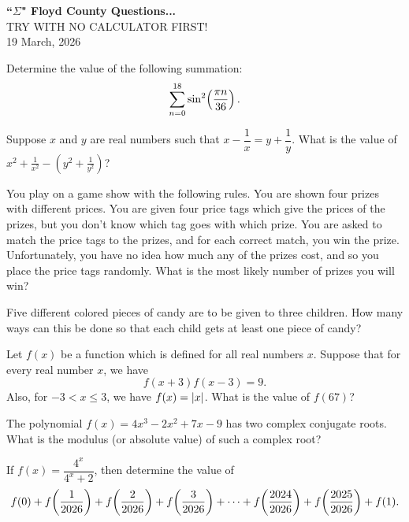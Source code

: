 \documentclass[11pt]{article}
\begin{document}
\begin{center}
{\Large\bfseries ``$\Sigma$" Floyd County Questions...}\\[0.25cm]
{\small TRY WITH NO CALCULATOR FIRST!}\\[0.25cm]
{\large 19 March, 2026}\\[1cm]
\end{center}



\problem Determine the value of the following summation:
\[
\sum_{n=0}^{18}\sin^2\!\left(\frac{\pi n}{36}\right).
\]

\problem Suppose $x$ and $y$ are real numbers such that $x-\dfrac{1}{x}=y+\dfrac{1}{y}$. What is the value of
$x^2+\frac{1}{x^2}-\left(y^2+\frac{1}{y^2}\right)$?

\problem You play on a game show with the following rules. You are shown four prizes with different prices. You are given four price tags which give the prices of the prizes, but you don't know which tag goes with which prize. You are asked to match the price tags to the prizes, and for each correct match, you win the prize. Unfortunately, you have no idea how much any of the prizes cost, and so you place the price tags randomly. What is the most likely number of prizes you will win?

\problem Five different colored pieces of candy are to be given to three children. How many ways can this be done so that each child gets at least one piece of candy?

\problem Let $f(x)$ be a function which is defined for all real numbers $x$. Suppose that for every real number $x$, we have
\[
f(x+3)f(x-3)=9.
\]
Also, for $-3<x\le 3$, we have $f(x)=\left|x\right|$. What is the value of $f(67)$?

\problem The polynomial $f(x)=4x^3-2x^2+7x-9$ has two complex conjugate roots. What is the modulus (or absolute value) of such a complex root?

\problem If $f(x)=\dfrac{4^x}{4^x+2}$, then determine the value of
\[
f(0)+f\!\left(\frac{1}{2026}\right)+f\!\left(\frac{2}{2026}\right)+f\!\left(\frac{3}{2026}\right)+\cdots
+f\!\left(\frac{2024}{2026}\right)+f\!\left(\frac{2025}{2026}\right)+f(1).
\]
\end{document}
